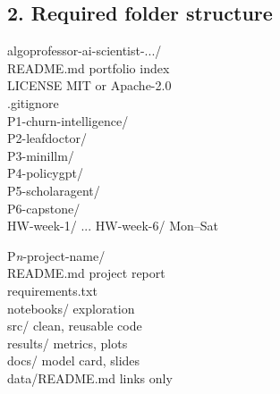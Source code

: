 \documentclass[11pt,a4paper]{article}
\begin{document}
\subsection*{2. Required folder structure}
\begin{minipage}[t]{0.47\linewidth}\vspace{0pt}
\begin{tcolorbox}[colback=navy,colframe=gold,boxrule=0.7pt,arc=2pt,coltext=white,fontupper=\small\ttfamily,left=6pt]
algoprofessor-ai-scientist-.../\\
\hspace*{1em}README.md \hfill {\color{gold}portfolio index}\\
\hspace*{1em}LICENSE \hfill {\color{gold}MIT or Apache-2.0}\\
\hspace*{1em}.gitignore\\
\hspace*{1em}P1-churn-intelligence/\\
\hspace*{1em}P2-leafdoctor/\\
\hspace*{1em}P3-minillm/\\
\hspace*{1em}P4-policygpt/\\
\hspace*{1em}P5-scholaragent/\\
\hspace*{1em}P6-capstone/\\
\hspace*{1em}HW-week-1/ ... HW-week-6/ \hfill {\color{gold}Mon--Sat}
\end{tcolorbox}
\end{minipage}\hfill
\begin{minipage}[t]{0.49\linewidth}\vspace{0pt}
\begin{tcolorbox}[colback=goldlight,colframe=gold,boxrule=0.7pt,arc=2pt,fontupper=\small\ttfamily,left=6pt]
P\textit{n}-project-name/\\
\hspace*{1em}README.md \hfill {\color{navylight}project report}\\
\hspace*{1em}requirements.txt\\
\hspace*{1em}notebooks/ \hfill {\color{navylight}exploration}\\
\hspace*{1em}src/ \hfill {\color{navylight}clean, reusable code}\\
\hspace*{1em}results/ \hfill {\color{navylight}metrics, plots}\\
\hspace*{1em}docs/ \hfill {\color{navylight}model card, slides}\\
\hspace*{1em}data/README.md \hfill {\color{navylight}links only}
\end{tcolorbox}
\end{minipage}
\end{document}
